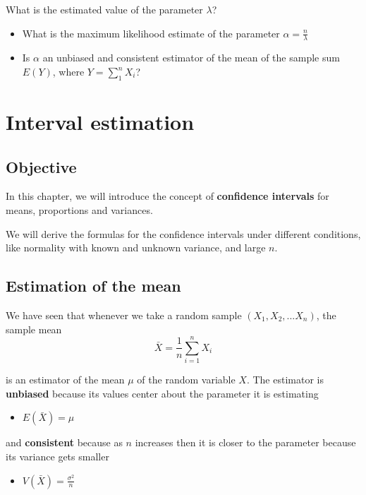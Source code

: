 \documentclass[
]{book}
\providecommand{\tightlist}{%
  \setlength{\itemsep}{0pt}\setlength{\parskip}{0pt}}
\begin{document}
What is the estimated value of the parameter \(\lambda\)?

\begin{itemize}
\item
  What is the maximum likelihood estimate of the parameter \(\alpha=\frac{n}{\lambda}\)
\item
  Is \(\alpha\) an unbiased and consistent estimator of the mean of the sample sum \(E(Y)\), where \(Y=\sum_1^n X_i\)?
\end{itemize}

\hypertarget{interval-estimation}{%
\chapter{Interval estimation}\label{interval-estimation}}

\hypertarget{objective-8}{%
\section{Objective}\label{objective-8}}

In this chapter, we will introduce the concept of \textbf{confidence intervals} for means, proportions and variances.

We will derive the formulas for the confidence intervals under different conditions, like normality with known and unknown variance, and large \(n\).

\hypertarget{estimation-of-the-mean}{%
\section{Estimation of the mean}\label{estimation-of-the-mean}}

We have seen that whenever we take a random sample \((X_1, X_2, ... X_n)\), the sample mean
\[\bar{X}=\frac{1}{n}\sum_{i=1}^n X_i\]

is an estimator of the mean \(\mu\) of the random variable \(X\). The estimator is \textbf{unbiased} because its values center about the parameter it is estimating

\begin{itemize}
\tightlist
\item
  \(E(\bar{X})=\mu\)
\end{itemize}

and \textbf{consistent} because as \(n\) increases then it is closer to the parameter because its variance gets smaller

\begin{itemize}
\tightlist
\item
  \(V(\bar{X})=\frac{\sigma^2}{n}\)
\end{itemize}
\end{document}
